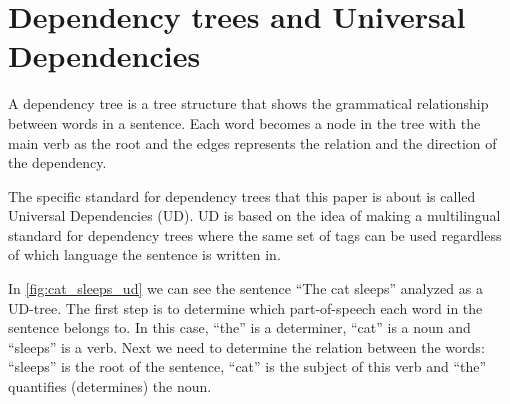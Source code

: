 
\section{Dependency trees and Universal Dependencies}
A dependency tree is a tree structure that shows the grammatical relationship between words in a sentence\cite{tesniere2015elements,nivre2006inductive}. Each word becomes a node in the tree with the main verb as the root and the edges represents the relation and the direction of the dependency.

The specific standard for dependency trees that this paper is about is called Universal Dependencies (UD)\cite{nivre-etal-2016-universal}. UD is based on the idea of making a multilingual standard for dependency trees where the same set of tags can be used regardless of which language the sentence is written in.

In \autoref{fig:cat_sleeps_ud} we can see the sentence ``The cat sleeps'' analyzed as a UD-tree. The first step is to determine which part-of-speech each word in the sentence belongs to. In this case, ``the'' is a determiner, ``cat'' is a noun and ``sleeps'' is a verb. Next we need to determine the relation between the words: ``sleeps'' is the root of the sentence, ``cat'' is the subject of this verb and ``the'' quantifies (determines) the noun.





